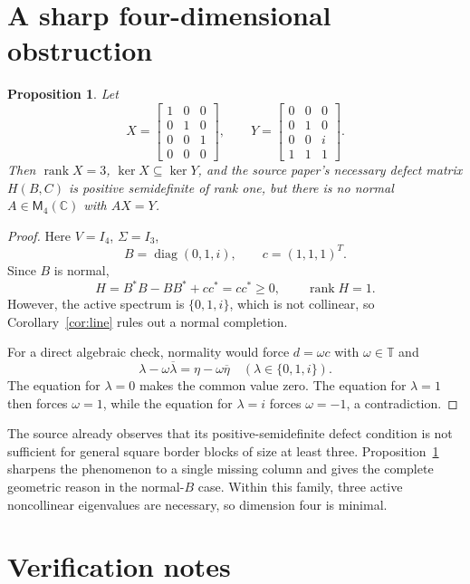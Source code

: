 \documentclass[11pt]{article}
\newtheorem{proposition}[theorem]{Proposition}
\newcommand{\C}{\mathbb C}
\newcommand{\M}{\mathsf M}
\newcommand{\T}{\mathbb T}
\newcommand{\rank}{\operatorname{rank}}
\begin{document}
\section{A sharp four-dimensional obstruction}

\begin{proposition}\label{prop:counterexample}
Let
\[
 X=\begin{bmatrix}1&0&0\\0&1&0\\0&0&1\\0&0&0\end{bmatrix},\qquad
 Y=\begin{bmatrix}0&0&0\\0&1&0\\0&0&i\\1&1&1\end{bmatrix}.
\]
Then $\rank X=3$, $\ker X\subseteq\ker Y$, and the source paper's necessary
defect matrix $H(B,C)$ is positive semidefinite of rank one, but there is no
normal $A\in\M_4(\C)$ with $AX=Y$.
\end{proposition}

\begin{proof}
Here $V=I_4$, $\Sigma=I_3$,
\[
 B=\operatorname{diag}(0,1,i),\qquad c=(1,1,1)^T.
\]
Since $B$ is normal,
\[
 H=B^*B-BB^*+cc^*=cc^*\ge0,
 \qquad \rank H=1.
\]
However, the active spectrum is $\{0,1,i\}$, which is not collinear, so
Corollary~\ref{cor:line} rules out a normal completion.

For a direct algebraic check, normality would force $d=\omega c$ with
$\omega\in\T$ and
\[
 \lambda-\omega\overline\lambda
 =\eta-\omega\overline\eta
 \quad(\lambda\in\{0,1,i\}).
\]
The equation for $\lambda=0$ makes the common value zero.  The equation for
$\lambda=1$ then forces $\omega=1$, while the equation for $\lambda=i$
forces $\omega=-1$, a contradiction.
\end{proof}

The source already observes that its positive-semidefinite defect condition
is not sufficient for general square border blocks of size at least three.
Proposition~\ref{prop:counterexample} sharpens the phenomenon to a single
missing column and gives the complete geometric reason in the normal-$B$
case.  Within this family, three active noncollinear eigenvalues are necessary,
so dimension four is minimal.

\section{Verification notes}
\end{document}
